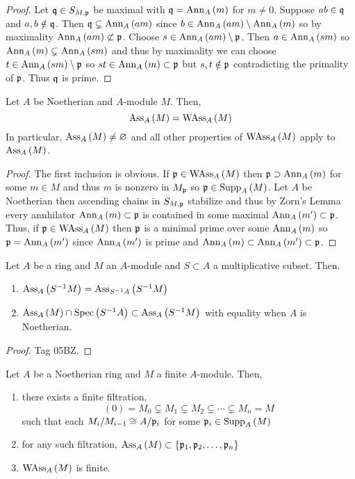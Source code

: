 \documentclass[12pt]{article}
\begin{document}
\begin{proof}
Let $\mathfrak{q} \in S_{M, \mathfrak{p}}$ be maximal with $\mathfrak{q} = \mathrm{Ann}_{A}\left(m\right)$ for $m \neq 0$. Suppose $ab \in \mathfrak{q}$ and $a, b \notin \mathfrak{q}$. Then $\mathfrak{q} \subsetneq \mathrm{Ann}_{A}\left(a m\right)$ since $b \in \mathrm{Ann}_{A}\left(a m\right) \setminus \mathrm{Ann}_{A}\left(m\right)$ so by maximality $\mathrm{Ann}_{A}\left(am\right) \not\subset \mathfrak{p}$. Choose $s \in \mathrm{Ann}_{A}\left(am\right) \setminus \mathfrak{p}$. Then $a \in \mathrm{Ann}_{A}\left(sm\right)$ so $\mathrm{Ann}_{A}\left(m\right) \subsetneq \mathrm{Ann}_{A}\left(sm\right)$ and thus by maximality we can choose $t \in \mathrm{Ann}_{A}\left(sm\right) \setminus \mathfrak{p}$ so $st \in \mathrm{Ann}_{A}\left(m\right) \subset \mathfrak{p}$ but $s,t \notin \mathfrak{p}$ contradicting the primality of $\mathfrak{p}$. Thus $\mathfrak{q}$ is prime. 
\end{proof}

\begin{prop}
Let $A$ be Noetherian and $A$-module $M$. Then,
\[ \mathrm{Ass}_{A}\left( M \right) = \mathrm{WAss}_{A}\left(M \right)  \]
In particular, $\mathrm{Ass}_{A}\left( M \right) \neq \varnothing$ and all other properties of $\mathrm{WAss}_{A}\left(M \right)$ apply to $\mathrm{Ass}_{A}\left( M \right)$.
\end{prop}

\begin{proof}
The first inclusion is obvious. If $\mathfrak{p} \in \mathrm{WAss}_{A}\left(M \right)$ then $\mathfrak{p} \supset \mathrm{Ann}_{A}\left(m\right)$ for some $m \in M$ and thus $m$ is nonzero in $M_{\mathfrak{p}}$ so $\mathfrak{p} \in \mathrm{Supp}_{A}\left(M \right)$. Let $A$ be Noetherian then ascending chains in $S_{M, \mathfrak{p}}$ stabilize and thus by Zorn's Lemma every annhilator $\mathrm{Ann}_{A}\left(m\right) \subset \mathfrak{p}$ is contained in some maximal $\mathrm{Ann}_{A}\left(m'\right) \subset \mathfrak{p}$. Thus, if $\mathfrak{p} \in \mathrm{WAss}_{A}\left(M \right)$ then $\mathfrak{p}$ is a minimal prime over some $\mathrm{Ann}_{A}\left(m\right)$ so $\mathfrak{p} = \mathrm{Ann}_{A}\left(m'\right)$ since $\mathrm{Ann}_{A}\left(m'\right)$ is prime and $\mathrm{Ann}_{A}\left(m\right) \subset \mathrm{Ann}_{A}\left(m'\right) \subset \mathfrak{p}$.
\end{proof}


\begin{lemma} \label{ass_primes_localization}
Let $A$ be a ring and $M$ an $A$-module and $S \subset A$ a multiplicative subset. Then.
\begin{enumerate}
\item $\mathrm{Ass}_{A}\left( S^{-1} M \right) = \mathrm{Ass}_{S^{-1} A}\left( S^{-1} M \right)$ 
\item $\mathrm{Ass}_{A}\left( M \right) \cap \mathrm{Spec}\left( S^{-1} A \right) \subset \mathrm{Ass}_{A}\left( S^{-1} M \right)$ with equality when $A$ is Noetherian.
\end{enumerate}
\end{lemma}

\begin{proof}
Tag 05BZ.
\end{proof}


\begin{proposition} \label{noetherian_finite_wass}
Let $A$ be a Noetherian ring and $M$ a finite $A$-module. Then,
\begin{enumerate}
\item there exists a finite filtration,
\[ (0) = M_0 \subsetneq M_1 \subsetneq M_2 \subsetneq \cdots \subsetneq M_n = M \]
such that each $M_{i} / M_{i-1} \cong A / \mathfrak{p}_{i}$ for some $\mathfrak{p}_i \in \mathrm{Supp}_{A} \left( M \right)$
\item for any such filtration, $\mathrm{Ass}_{A}\left( M \right) \subset \{ \mathfrak{p}_1, \mathfrak{p}_2, \dots, \mathfrak{p}_n\}$
\item $\mathrm{WAss}_{A}\left(M \right)$ is finite.
\end{enumerate}
\end{proposition}
\end{document}
